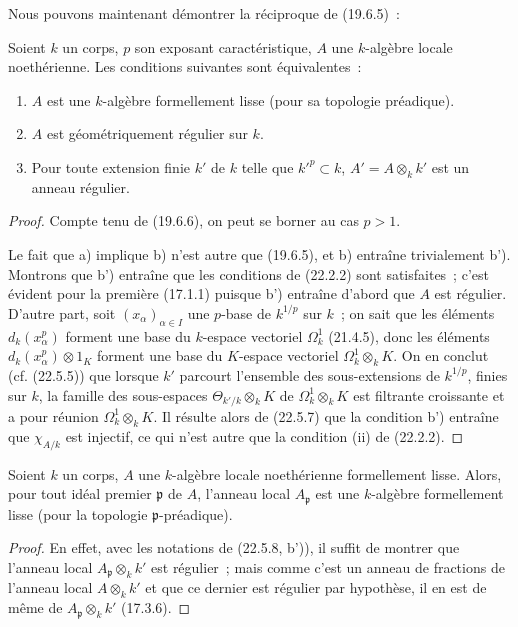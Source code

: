 Nous pouvons maintenant démontrer la réciproque de (19.6.5)~:

\begin{theorem}[22.5.8]
\label{0.22.5.8-fr}
Soient $k$ un corps, $p$ son exposant caractéristique, $A$ une $k$-algèbre
locale noethérienne. Les conditions suivantes sont équivalentes~:
\begin{enumerate}
  \item[a)] $A$ est une $k$-algèbre formellement lisse (pour sa topologie
  préadique).
  \item[b)] $A$ est géométriquement régulier sur $k$.
  \item[b')] Pour toute extension finie $k'$ de $k$ telle que $k'^p\subset k$,
  $A'=A\otimes_kk'$ est un anneau régulier.
\end{enumerate}
\end{theorem}

\begin{proof}
Compte tenu de (19.6.6), on peut se borner au cas $p>1$.

Le fait que a) implique b) n'est autre que (19.6.5), et b) entraîne
trivialement b'). Montrons que b') entraîne que les conditions de (22.2.2) sont
satisfaites~; c'est évident pour la première (17.1.1) puisque b') entraîne
d'abord que $A$ est régulier. D'autre part, soit $(x_\alpha)_{\alpha\in I}$ une
$p$-base de $k^{1/p}$ sur $k$~; on sait que les éléments $d_k(x_\alpha^p)$
forment une base du $k$-espace vectoriel $\Omega^1_k$ (21.4.5), donc les
éléments $d_k(x_\alpha^p)\otimes1_K$ forment une base du $K$-espace vectoriel
$\Omega^1_k\otimes_kK$. On en conclut (cf. (22.5.5)) que lorsque $k'$ parcourt
l'ensemble des sous-extensions de $k^{1/p}$, finies sur $k$, la famille des
sous-espaces $\Theta_{k'/k}\otimes_kK$ de $\Omega^1_k\otimes_kK$ est filtrante
croissante et a pour réunion $\Omega^1_k\otimes_kK$. Il résulte alors de
(22.5.7) que la condition b') entraîne que $\chi_{A/k}$ est injectif, ce qui
n'est autre que la condition (ii) de (22.2.2).
\end{proof}

\begin{corollary}[22.5.9]
\label{0.22.5.9-fr}
Soient $k$ un corps, $A$ une $k$-algèbre locale noethérienne formellement
lisse. Alors, pour tout idéal premier $\mathfrak p$ de $A$, l'anneau local
$A_{\mathfrak p}$ est une $k$-algèbre formellement lisse (pour la topologie
$\mathfrak p$-préadique).
\end{corollary}

\begin{proof}
En effet, avec les notations de (22.5.8, b')), il suffit de montrer que
l'anneau local $A_{\mathfrak p}\otimes_kk'$ est régulier~; mais comme c'est un
anneau de fractions de l'anneau local $A\otimes_kk'$ et que ce dernier est
régulier par hypothèse, il en est de même de $A_{\mathfrak p}\otimes_kk'$
(17.3.6).
\end{proof}

